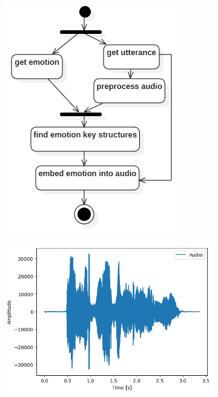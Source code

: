 \documentclass[11pt]{article}
\begin{document}
\begin{figure}
\begin{subfigure}{.15\textwidth}
  \centering
  \includegraphics[width=.8\linewidth]{"Bilder/Prozess.PNG"}
  \label{fig:sfig1}
\end{subfigure}%
\begin{subfigure}{.15\textwidth}
  \centering
  \includegraphics[width=.8\linewidth]{Bilder/art_sad.png}
  \label{fig:sfig2}
\end{subfigure}
\begin{subfigure}{.15\textwidth}
  \centering

\end{subfigure}
\end{figure}
\end{document}
